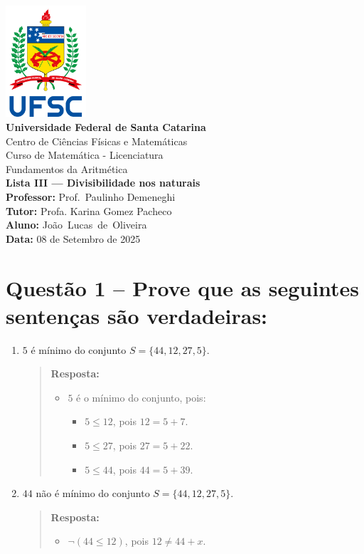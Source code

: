 \documentclass[12pt,a4paper]{article}
\newcommand{\universidade}{Universidade Federal de Santa Catarina}
\newcommand{\centro}{Centro de Ciências Físicas e Matemáticas}
\newcommand{\curso}{Curso de Matemática - Licenciatura}
\newcommand{\disciplina}{Fundamentos da Aritmética}
\newcommand{\professor}{Prof.\ Paulinho Demeneghi}
\newcommand{\answer}[1]{\begin{quote}#1\end{quote}}
\newcommand{\tutora}{Profa. Karina Gomez Pacheco}
\newcommand{\autor}{João\ Lucas\ de\ Oliveira}
\newcommand{\dataentrega}{08 de Setembro de 2025}
\begin{document}
\begin{center}
    \includegraphics[width=3cm]{ufsc_logo}\\[0.3cm]
    \textbf{\universidade}\\
    \centro\\
    \curso\\[1cm]
    \disciplina\\
    \textbf{Lista III --- Divisibilidade nos naturais}\\[0.5cm]
    \textbf{Professor:} \professor\\
    \textbf{Tutor:} \tutora\\
    \textbf{Aluno:} \autor\\
    \textbf{Data:} \dataentrega\\
\end{center}

\vspace{1cm}

\section*{Questão 1 -- Prove que as seguintes sentenças são verdadeiras:}

    \begin{enumerate}[label= (\alph*)]
        \item $5$ é mínimo do conjunto $S = \{44, 12, 27, 5\}$.
        \answer{
            \textbf{Resposta:}
            \begin{itemize}
                \item $5$ é o mínimo do conjunto, pois:
                    \begin{itemize}
                        \item $5 \leq 12$, pois $12 = 5 + 7$.
                        \item $5 \leq 27$, pois $27 = 5 + 22$.
                        \item $5 \leq 44$, pois $44 = 5 + 39$.
                    \end{itemize}
            \end{itemize}
        }
        \item $44$ não é mínimo do conjunto $S = \{44, 12, 27, 5\}$.
        \answer{
            \textbf{Resposta:}
            \begin{itemize}
                \item $\neg (44 \leq 12)$, pois $12 \neq 44 + x$.
            \end{itemize}
        }
    \end{enumerate}
\end{document}
